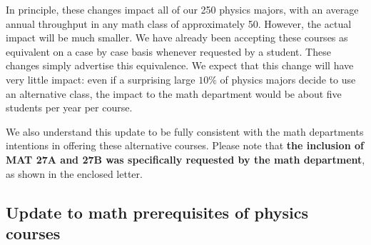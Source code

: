 \documentclass[12pt]{article}
\begin{document}
In principle, these changes impact all of our 250 physics majors, with
an average annual throughput in any math class of approximately 50.
However, the actual impact will be much smaller.  We have already been
accepting these courses as equivalent on a case by case basis whenever
requested by a student.  These changes simply advertise this
equivalence.  We expect that this change will have very little impact:
even if a surprising large $10\%$ of physics majors decide to use an
alternative class, the impact to the math department would be about
five students per year per course.

We also understand this update to be fully consistent with the math
departments intentions in offering these alternative courses.  Please
note that {\bf the inclusion of MAT 27A and 27B was specifically
requested by the math department}, as shown in the enclosed letter.


\newpage
\subsection{Update to math prerequisites of physics courses}
\end{document}
